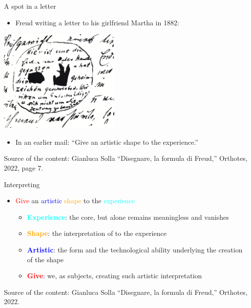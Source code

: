 \documentclass{beamer}
\begin{document}
\begin{frame}
{\centerline{A spot in a letter}}
 
\begin{itemize}
    \item Freud writing a letter to his girlfriend Martha in 1882:
\end{itemize} 

\begin{center}
 \includegraphics[width=6cm]{P2023.AIBCCSS.Drawing/LetterFreudGirlfriend.png}
 
 \end{center}
 
\begin{itemize}
    \item In an earlier mail: ``Give an artistic shape to the experience.''
\end{itemize} 

\begin{center}
\tiny
Source of the content: Gianluca Solla ``Disegnare, la formula di Freud,'' Orthotes, 2022, page 7.
\end{center}
\end{frame}

\begin{frame}
{\centerline{Interpreting}}
 
\begin{itemize}
    \item \textcolor{red}{Give} an \textcolor{blue}{artistic} \textcolor{orange}{shape} to the \textcolor{cyan}{experience} \newline
\begin{itemize}
    \item \textcolor{cyan}{\bf Experience}: the core, but alone remains meaningless and vanishes\newline
    \item \textcolor{orange}{\bf Shape}: the interpretation of to the experience \newline
    \item \textcolor{blue}{\bf Artistic}: the form and the technological ability underlying the creation of the shape\newline
    \item \textcolor{red}{\bf Give}: we, as subjects, creating such artistic interpretation\newline
\end{itemize} 
\end{itemize} 

\begin{center}
\tiny
Source of the content: Gianluca Solla ``Disegnare, la formula di Freud,'' Orthotes, 2022.
\end{center}
\end{frame}
\end{document}
